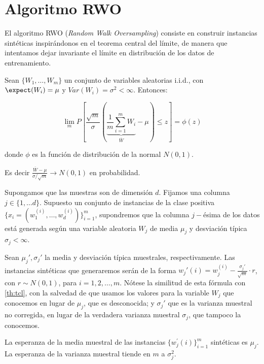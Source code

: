 \section{Algoritmo RWO}
El algoritmo RWO (\textit{Random Walk Oversampling}) consiste en construir instancias sintéticas inspirándonos
en el teorema central del límite, de manera que intentamos dejar invariante el límite en distribución de los
datos de entrenamiento.

\begin{theorem}
 Sean $\{W_1, \ldots, W_m\}$ un conjunto de variables aleatorias i.i.d., con $\expect(W_i) = \mu$ y 
 $Var(W_i) = \sigma^2 < \infty$. Entonces:
 
 \[\lim_{m} P\left[\frac{\sqrt{m}}{\sigma} \left(\underbrace{\frac{1}{m}\sum_{i=1}^m W_i}_{\overline{W}} - 
   \mu \right) \le z \right] = \phi(z)\]
 
 donde $\phi$ es la función de distribución de la normal $N(0,1)$.
 
 Es decir $\frac{\overline{W} - \mu}{\sigma/\sqrt{m}} \rightarrow N(0,1)$ en probabilidad.
 
 \label{th:tcl}
\end{theorem}

Supongamos que las muestras son de dimensión $d$. Fijamos una columna $j\in \{1, \ldots d\}$. Supuesto un
conjunto de instancias de la clase positiva $\{x_i=(w_1^{(i)}, \ldots, w_d^{(i)})\}_{i=1}^m$, supondremos que la
columna $j-$ésima de los datos está generada según una variable aleatoria $W_j$ de media $\mu_j$ y desviación
típica $\sigma_j < \infty$.

Sean $\mu_j', \sigma_j'$ la media y desviación típica muestrales, respectivamente. Las instancias sintéticas 
que generaremos serán de la forma $w_j'(i) = w_j^{(i)} - \frac{\sigma_j'}{\sqrt{m}} \cdot r$, con 
$r\sim N(0,1)$, para $i=1, 2, \ldots, m$. Nótese la similitud de esta fórmula con \ref{th:tcl}, con la salvedad
de que usamos los valores para la variable $W_j$ que conocemos en lugar de $\mu_j$, que es desconocida; y 
$\sigma_j'$ que es la varianza muestral no corregida, en lugar de la verdadera varianza muestral $\sigma_j$, 
que tampoco la conocemos.

\begin{theorem}
 La esperanza de la media muestral de las instancias $\{w_j^{'}(i)\}_{i=1}^m$ sintéticas es $\mu_j$. 
 La esperanza de la varianza muestral tiende en $m$ a $\sigma_j^2$.
\end{theorem}

